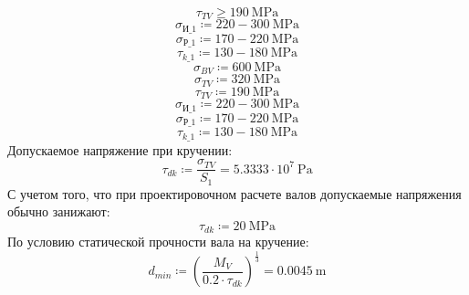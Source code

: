 \documentclass{article}
\newcommand{\defeq}{\coloneq} %
\begin{document}
\begin{equation*}
τ_{TV} \geq 190 \: \mathrm{MPa}
\end{equation*}
\begin{equation*}
\textit{σ}_{\textit{И\_1}} \defeq 220-300 \: \mathrm{MPa}
\end{equation*}
\begin{equation*}
\textit{σ}_{\textit{Р\_1}} \defeq 170-220 \: \mathrm{MPa}
\end{equation*}
\begin{equation*}
\textit{τ}_{\textit{k\_1}} \defeq 130-180 \: \mathrm{MPa}
\end{equation*}
\begin{equation*}
σ_{BV} \defeq 600 \: \mathrm{MPa}
\end{equation*}
\begin{equation*}
σ_{TV} \defeq 320 \: \mathrm{MPa}
\end{equation*}
\begin{equation*}
τ_{TV} \defeq 190 \: \mathrm{MPa}
\end{equation*}
\begin{equation*}
\textit{σ}_{\textit{И\_1}} \defeq 220-300 \: \mathrm{MPa}
\end{equation*}
\begin{equation*}
\textit{σ}_{\textit{Р\_1}} \defeq 170-220 \: \mathrm{MPa}
\end{equation*}
\begin{equation*}
\textit{τ}_{\textit{k\_1}} \defeq 130-180 \: \mathrm{MPa}
\end{equation*}
\colorbox[HTML]{000000}{Допускаемое напряжение при кручении:}\newline
\begin{equation*}
τ_{dk} \defeq \frac{σ_{TV}}{\textit{S}_{\textit{1}}} = {5.3333 \cdot 10^{7} \: \mathrm{Pa}}
\end{equation*}
\colorbox[HTML]{000000}{С учетом того, что при проектировочном расчете валов допускаемые напряжения обычно занижают:}\newline
\begin{equation*}
τ_{dk} \defeq 20 \: \mathrm{MPa}
\end{equation*}
\colorbox[HTML]{000000}{По условию статической прочности вала на кручение:}\newline
\begin{equation*}
d_{min} \defeq \left( \frac{M_{V}}{0.2 \cdot τ_{dk}} \right)^{\frac{1}{3}} = {0.0045 \: \mathrm{m}}
\end{equation*}
\end{document}
